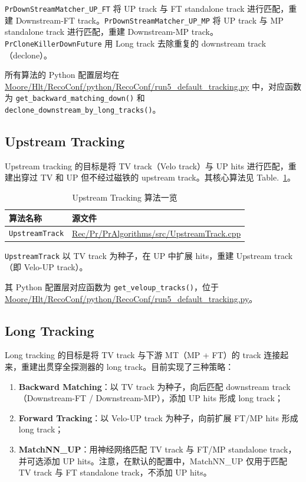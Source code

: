 \documentclass[UTF8]{article}
\begin{document}
\texttt{PrDownStreamMatcher\_UP\_FT} 将 UP track 与 FT standalone track 进行匹配，重建 Downstream-FT track。\texttt{PrDownStreamMatcher\_UP\_MP} 将 UP track 与 MP standalone track 进行匹配，重建 Downstream-MP track。\texttt{PrCloneKillerDownFuture} 用 Long track 去除重复的 downstream track（declone）。

所有算法的 Python 配置层均在 \url{Moore/Hlt/RecoConf/python/RecoConf/run5_default_tracking.py} 中，对应函数为 \lstinline{get_backward_matching_down()} 和 \lstinline{declone_downstream_by_long_tracks()}。

\subsection{Upstream Tracking}

Upstream tracking 的目标是将 TV track（Velo track）与 UP hits 进行匹配，重建出穿过 TV 和 UP 但不经过磁铁的 upstream track。其核心算法见 Table.~\ref{tab:upstream-algos}。

\begin{table}[htbp]
  \centering
  \caption{Upstream Tracking 算法一览}
  \label{tab:upstream-algos}
  \begin{tabular}{ll}
    \toprule
    算法名称 & 源文件 \\
    \midrule
    \texttt{UpstreamTrack} & \url{Rec/Pr/PrAlgorithms/src/UpstreamTrack.cpp} \\
    \bottomrule
  \end{tabular}
\end{table}

\texttt{UpstreamTrack} 以 TV track 为种子，在 UP 中扩展 hits，重建 Upstream track（即 Velo-UP track）。

其 Python 配置层对应函数为 \lstinline{get_veloup_tracks()}，位于 \url{Moore/Hlt/RecoConf/python/RecoConf/run5_default_tracking.py}。

\subsection{Long Tracking}

Long tracking 的目标是将 TV track 与下游 MT（MP + FT）的 track 连接起来，重建出贯穿全探测器的 long track。目前实现了三种策略：
\begin{enumerate}
  \item \textbf{Backward Matching}：以 TV track 为种子，向后匹配 downstream track（Downstream-FT / Downstream-MP），添加 UP hits 形成 long track；
  \item \textbf{Forward Tracking}：以 Velo-UP track 为种子，向前扩展 FT/MP hits 形成 long track；
  \item \textbf{MatchNN\_UP}：用神经网络匹配 TV track 与 FT/MP standalone track，并可选添加 UP hits。注意，在默认的配置中，MatchNN\_UP 仅用于匹配 TV track 与 FT standalone track，不添加 UP hits。
\end{enumerate}
\end{document}

